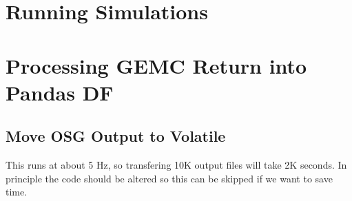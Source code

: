 \iffalse
Make send emails
Rewrite scripts with time values printed out and estimated time to finish
Use outputdir volatile/dir in batch farm scripts!
Reconfigure root to pkl scripts to generate:
run num  - event num - heli - beam q - particle di - px - py - pz
for all particles

 put the filtered experirimenta epg data set at
/volatile/clas12/sangbaek/epg/inb
/volatile/clas12/sangbaek/epg/outb
If one wants to further filter out these data set for pi0, use minimal/convertEPG at https://github.com/Sangbaek/convertingHipo


SIM DATA:
run filtering
convert to root

GEN DATA:
convert to root

GENERATOR:
location:
tools/aao_gen
USAGE:
write in farm usage here

DST COPIER:
work/tools/other-tools/dst_copier_from_gemc_output.py
USAGE: go into the python script and manually change the input and output locations, then run it.

FILTER:
location:
work/tools/fiducial-filtering/filterEvents/bin/filterEvents
USAGE: ./bin/filterEvents -p "polarity" -s start -e end -t /path/to/hipo/files

CONVERTER:
location:
/tools/convert-hipo-to-root/convertingHipo/all/convertRec

PATH TO RESULTS:

copy all files from raw OSG output to a centralized location

monitor batch jobs: https://scicomp.jlab.org/scicomp/index.html#/farmJobs/activeJob

CONVERSION:
https://github.com/Sangbaek/convertingHipo

\fi

\section{Running Simulations}

\section{Processing GEMC Return into Pandas DF}

    \subsection{Move OSG Output to Volatile}
        This runs at about 5 Hz, so transfering 10K output files will take 2K seconds. In principle the code should be altered so this can be skipped if we want to save time.

